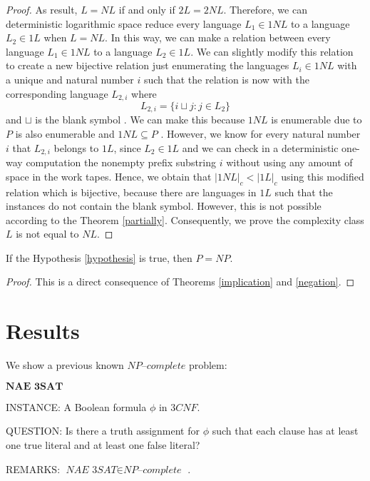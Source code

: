 \documentclass[a4paper,UKenglish,cleveref, autoref]{lipics-v2019}
\begin{document}
\begin{proof}
As result, $L = NL$ if and only if $2L = 2NL$. Therefore, we can deterministic logarithmic space reduce every language $L_{1} \in 1NL$ to a language $L_{2} \in 1L$ when $L = NL$. In this way, we can make a relation between every language $L_{1} \in 1NL$ to a language $L_{2} \in 1L$. We can slightly modify this relation to create a new bijective relation just enumerating the languages $L_{i} \in 1NL$ with a unique and natural number $i$ such that the relation is now with the corresponding language $L_{2, i}$ where
\[L_{2, i} = \{i \sqcup j: j \in L_{2}\}\]
and $\sqcup$ is the blank symbol \cite{Pap03}. We can make this because $1NL$ is enumerable due to $P$ is also enumerable and $1NL \subseteq P$ \cite{Pap03}. However, we know for every natural number $i$ that $L_{2, i}$ belongs to $1L$, since $L_{2} \in 1L$ and we can check in a deterministic one-way computation the nonempty prefix substring $i$ without using any amount of space in the work tapes. Hence, we obtain that $|1NL|_{c} < |1L|_{c}$ using this modified relation which is bijective, because there are languages in $1L$ such that the instances do not contain the blank symbol. However, this is not possible according to the Theorem \ref{partially}. Consequently, we prove the complexity class $L$ is not equal to $NL$.
\end{proof}

\begin{theorem}
\label{argument}
If the Hypothesis \ref{hypothesis} is true, then $P = NP$.
\end{theorem}

\begin{proof}
This is a direct consequence of Theorems \ref{implication} and \ref{negation}.
\end{proof}

\section{Results}

We show a previous known $\textit{NP--complete}$ problem:

\begin{definition}
$\textbf{NAE 3SAT}$

INSTANCE: A Boolean formula $\phi$ in $3CNF$.

QUESTION: Is there a truth assignment for $\phi$ such that each clause has at least one true literal and at least one false literal?

REMARKS: $\textit{NAE 3SAT} \in \textit{NP--complete}$ \cite{GJ79}.
\end{definition}
\end{document}
